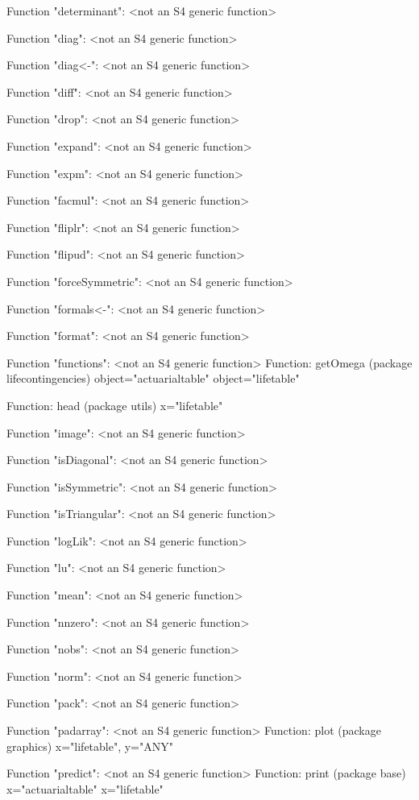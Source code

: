 \documentclass[nojss]{jss}
\begin{document}
\begin{Schunk}
\begin{Soutput}
Function "determinant":
 <not an S4 generic function>

Function "diag":
 <not an S4 generic function>

Function "diag<-":
 <not an S4 generic function>

Function "diff":
 <not an S4 generic function>

Function "drop":
 <not an S4 generic function>

Function "expand":
 <not an S4 generic function>

Function "expm":
 <not an S4 generic function>

Function "facmul":
 <not an S4 generic function>

Function "fliplr":
 <not an S4 generic function>

Function "flipud":
 <not an S4 generic function>

Function "forceSymmetric":
 <not an S4 generic function>

Function "formals<-":
 <not an S4 generic function>

Function "format":
 <not an S4 generic function>

Function "functions":
 <not an S4 generic function>
Function: getOmega (package lifecontingencies)
object="actuarialtable"
object="lifetable"

Function: head (package utils)
x="lifetable"


Function "image":
 <not an S4 generic function>

Function "isDiagonal":
 <not an S4 generic function>

Function "isSymmetric":
 <not an S4 generic function>

Function "isTriangular":
 <not an S4 generic function>

Function "logLik":
 <not an S4 generic function>

Function "lu":
 <not an S4 generic function>

Function "mean":
 <not an S4 generic function>

Function "nnzero":
 <not an S4 generic function>

Function "nobs":
 <not an S4 generic function>

Function "norm":
 <not an S4 generic function>

Function "pack":
 <not an S4 generic function>

Function "padarray":
 <not an S4 generic function>
Function: plot (package graphics)
x="lifetable", y="ANY"


Function "predict":
 <not an S4 generic function>
Function: print (package base)
x="actuarialtable"
x="lifetable"



\end{Soutput}
\end{Schunk}
\end{document}
